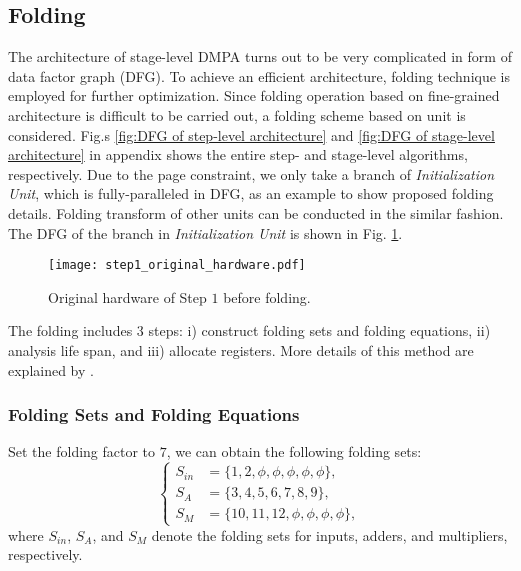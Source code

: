 \documentclass[journal,twoside]{IEEEtran}
\begin{document}
\subsection{Folding}
The architecture of stage-level DMPA turns out to be very complicated in form of data factor graph (DFG). To achieve an efficient architecture, folding technique is employed for further optimization. Since folding operation based on fine-grained architecture is difficult to be carried out, a folding scheme based on unit is considered. Fig.s \ref{fig:DFG of step-level architecture} and \ref{fig:DFG of stage-level architecture} in appendix shows the entire step- and stage-level algorithms, respectively. Due to the page constraint, we only take a branch of \emph{Initialization Unit}, which is fully-paralleled in DFG, as an example to show proposed folding details. Folding transform of other units can be conducted in the similar fashion. The DFG of the branch in \emph{Initialization Unit} is shown in Fig. \ref{fig:Original hardware of step1 in need of folding}.
\begin{figure}[htbp]
\centering
\texttt{[image: step1\_original\_hardware.pdf]}
\caption{Original hardware of Step $1$ before folding.}
\label{fig:Original hardware of step1 in need of folding}
\end{figure}

The folding includes $3$ steps: i) construct folding sets and folding equations, ii) analysis life span, and iii) allocate registers. More details of this method are explained by \cite{parhi2007vlsi}.

\subsubsection{Folding Sets and Folding Equations}
Set the folding factor to $7$, we can obtain the following folding sets:
\begin{equation}\label{eq:s}
\left\{
\begin{aligned}
  S_{in}&= \{1,2,\phi,\phi,\phi,\phi,\phi\},\\
  S_{A} &= \{3,4,5,6,7,8,9\},\\
  S_{M} &= \{10,11,12,\phi,\phi,\phi,\phi\},
\end{aligned}
\right.
\end{equation}
where $S_{in}$, $S_{A}$, and $S_{M}$ denote the folding sets for inputs, adders, and multipliers, respectively.
\end{document}
